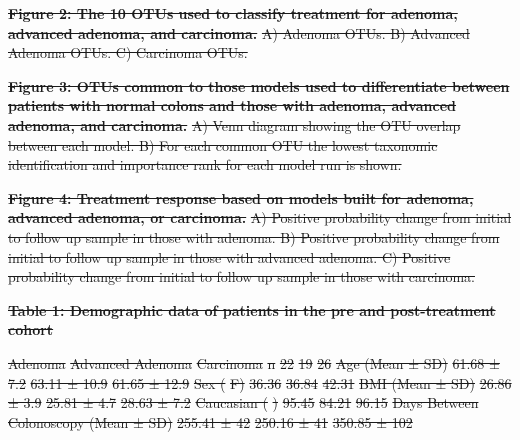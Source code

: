 \documentclass[12pt,]{article}
\providecommand{\DIFdeltex}[1]{{\protect\color{red}\sout{#1}}}                      %
\providecommand{\DIFdel}[1]{\texorpdfstring{\DIFdeltex{#1}}{}} %
\begin{document}
\textbf{\DIFdel{Figure 2: The 10 OTUs used to classify treatment for adenoma,
advanced adenoma, and carcinoma.}} %
\DIFdel{A) Adenoma OTUs. B) Advanced Adenoma
OTUs. C) Carcinoma OTUs.
}%

\textbf{\DIFdel{Figure 3: OTUs common to those models used to differentiate
between patients with normal colons and those with adenoma, advanced
adenoma, and carcinoma.}} %
\DIFdel{A) Venn diagram showing the OTU overlap between
each model. B) For each common OTU the lowest taxonomic identification
and importance rank for each model run is shown.
}%

\textbf{\DIFdel{Figure 4: Treatment response based on models built for adenoma,
advanced adenoma, or carcinoma.}} %
\DIFdel{A) Positive probability change from
initial to follow up sample in those with adenoma. B) Positive
probability change from initial to follow up sample in those with
advanced adenoma. C) Positive probability change from initial to follow
up sample in those with carcinoma.
}%


\textbf{\DIFdel{Table 1: Demographic data of patients in the pre and
post-treatment cohort}}

\DIFdel{Adenoma }%
\DIFdel{Advanced Adenoma }%
\DIFdel{Carcinoma}%
\DIFdel{n }%
\DIFdel{22 }%
\DIFdel{19 }%
\DIFdel{26}%
\DIFdel{Age (Mean ± SD) }%
\DIFdel{61.68 ± 7.2 }%
\DIFdel{63.11 ± 10.9 }%
\DIFdel{61.65 ±
12.9}%
\DIFdel{Sex (}%
\DIFdel{F) }%
\DIFdel{36.36 }%
\DIFdel{36.84 }%
\DIFdel{42.31}%
\DIFdel{BMI (Mean ± SD) }%
\DIFdel{26.86 ± 3.9 }%
\DIFdel{25.81 ± 4.7 }%
\DIFdel{28.63 ± 7.2}%
\DIFdel{Caucasian (}%
\DIFdel{) }%
\DIFdel{95.45 }%
\DIFdel{84.21 }%
\DIFdel{96.15}%
\DIFdel{Days Between Colonoscopy (Mean ± SD) }%
\DIFdel{255.41 ± 42 }%
\DIFdel{250.16 ± 41 }%
\DIFdel{350.85 ± 102}%
\end{document}
